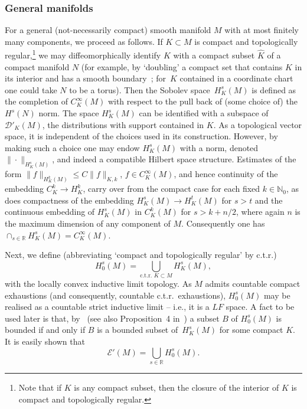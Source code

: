 \documentclass[11pt]{article}
\numberwithin{equation}{section}
\numberwithin{equation}{section}
\newcommand{\RR}{{\mathbb R}}
\newcommand{\NN}{{\mathbb N}}
\newcommand{\DD}{{\mathscr D}}
\newcommand{\EE}{{\mathscr E}}
\begin{document}
 \subsubsection{General manifolds}

 For a general (not-necessarily compact) smooth manifold $M$ with at most finitely many components,
 we proceed as follows. If $K\subset M$ is compact and topologically regular,\footnote{Note that if $K$ is any compact subset, then the closure of the interior of $K$ is compact and topologically regular.} we may
 diffeomorphically identify $K$ with a compact subset $\hat{K}$ of a compact manifold $N$ (for example, by `doubling' a compact set that contains $K$ in its interior and has a smooth boundary~\cite{BaerWafo:2015}; for~$K$ contained in a coordinate chart one could take $N$ to be a torus). Then the Sobolev space~$H^s_K(M)$ is defined as the completion of
 $C^\infty_K(M)$ with respect to the pull back of (some choice of) the~$H^s(N)$ norm. The space $H^s_K(M)$ can be identified with a subspace of $\DD'_K(M)$, the distributions with support contained in $K$. As a topological vector space, it is independent of the choices used in its construction. However, by making such a choice one may
 endow $H^s_K(M)$ with a norm, denoted $\|\cdot\|_{H^s_K(M)}$, and indeed a compatible Hilbert space structure.
 Estimates of the form
 $\|f\|_{H^k_K(M)}\le C\|f\|_{K,k}$, $f\in C^\infty_K(M)$, and hence continuity of
 the embedding $C^k_K\to H^k_K$, carry over from the compact case for each fixed $k\in\NN_0$, as does compactness of the embedding $H^{s}_K(M)\to H^{t}_K(M)$ for $s>t$
 and the continuous embedding of $H^s_K(M)$ in $C^k_K(M)$ for $s>k+n/2$,
 where again $n$ is the maximum dimension of any component of $M$.
 Consequently one has $\cap_{s\in\RR} H^s_K(M)=C^\infty_K(M)$.

 Next, we define (abbreviating `compact and topologically regular' by c.t.r.)
 \begin{equation*}
 	H_0^s(M) = \bigcup_{\text{c.t.r. $K\subset M$}} H^s_K(M),
 \end{equation*}
 with the locally convex inductive limit topology.
 As $M$ admits countable compact exhaustions (and consequently, countable c.t.r.\ exhaustions), $H_0^s(M)$ may be realised as a countable strict inductive limit -- i.e., it is a $LF$ space. A fact to be used later is that, by~\cite[Proposition~14.6]{Treves:TVS} (see also Proposition~4 in~\cite{DieudonneSchwartz:1949}) a subset $B$ of $H_0^s(M)$ is bounded if and only if $B$ is a bounded subset of~$H^s_K(M)$ for some compact $K$. It is easily shown that
 \begin{equation*}
 	\EE'(M) = \bigcup_{s\in\RR} H_0^{s}(M).
 \end{equation*}
\end{document}
